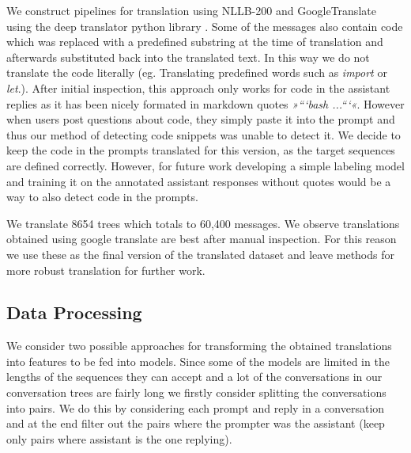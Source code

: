 \documentclass[fleqn,moreauthors,10pt]{ds_report}
\begin{document}
    We construct pipelines for translation using NLLB-200 \cite{nllb2022} and GoogleTranslate \cite{google-translate} using the deep translator python library \cite{deep_transaltor}.
    Some of the messages also contain code which was replaced with a predefined substring at the time of translation and afterwards substituted back into the translated text.
    In this way we do not translate the code literally (eg. Translating predefined words such as \textit{import} or \textit{let}.). After initial inspection, this approach only works for code in the assistant replies as it has been nicely formated in markdown quotes  \textit{»```bash ...```«}. However when users post questions about code, they simply paste it into the prompt and thus our method of detecting code snippets was unable to detect it. 
    We decide to keep the code in the prompts translated for this version, as the target sequences are defined correctly. However, for future work developing a simple labeling model and training it on the annotated assistant responses without quotes would be a way to also detect code in the prompts.
    
    We translate 8654 trees which totals to 60,400 messages.
    We observe translations obtained using google translate are best after manual inspection. For this reason we use these as the final version of the translated dataset and leave methods for more robust translation for further work.


    \subsection*{Data Processing}
    
    We consider two possible approaches for transforming the obtained translations into features to be fed into models.
    Since some of the models are limited in the lengths of the sequences they can accept and a lot of the conversations in our conversation trees are fairly long we firstly consider splitting the conversations into pairs.
    We do this by considering each prompt and reply in a conversation and at the end filter out the pairs where the prompter was the assistant (keep only pairs where assistant is the one replying).
    
\end{document}
